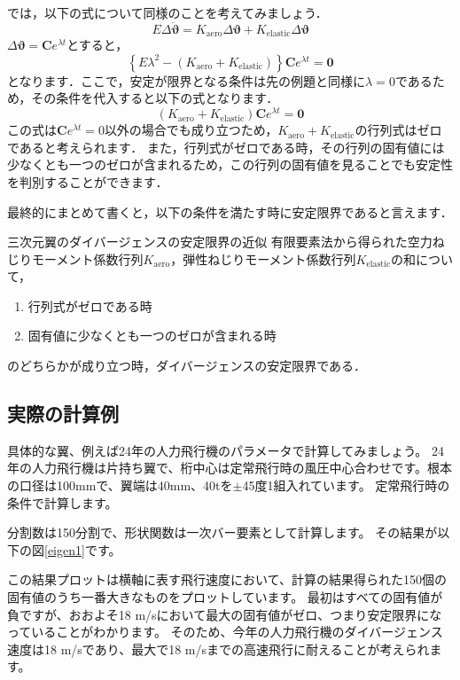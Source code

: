 \documentclass{jarticle}
\begin{document}
では，以下の式について同様のことを考えてみましょう．
\begin{equation}
    E\Delta\ddot{\bm{\vartheta}} = K_\mathrm{aero} \Delta\bm{\vartheta} + K_\mathrm{elastic} \Delta\bm{\vartheta}
\end{equation}
$\Delta\bm{\vartheta} = \bm{C}e^{\lambda t}$とすると，
\begin{equation}
    \left\{ E\lambda^2 - (K_\mathrm{aero} + K_\mathrm{elastic}) \right\}\bm{C}e^{\lambda t} = \bm{0}
\end{equation}
となります．ここで，安定が限界となる条件は先の例題と同様に$\lambda = 0$であるため，その条件を代入すると以下の式となります．
\begin{equation}
    (K_\mathrm{aero} + K_\mathrm{elastic})\bm{C}e^{\lambda t} = \bm{0}
\end{equation}
この式は$\bm{C}e^{\lambda t}=0$以外の場合でも成り立つため，$K_\mathrm{aero} + K_\mathrm{elastic}$の行列式はゼロであると考えられます．
また，行列式がゼロである時，その行列の固有値には少なくとも一つのゼロが含まれるため，この行列の固有値を見ることでも安定性を判別することができます．

最終的にまとめて書くと，以下の条件を満たす時に安定限界であると言えます．
\begin{itembox}[l]{三次元翼のダイバージェンスの安定限界の近似}
    有限要素法から得られた空力ねじりモーメント係数行列$K_\mathrm{aero}$，弾性ねじりモーメント係数行列$K_\mathrm{elastic}$の和について，
    \begin{enumerate}
        \item 行列式がゼロである時
        \item 固有値に少なくとも一つのゼロが含まれる時
    \end{enumerate}
    のどちらかが成り立つ時，ダイバージェンスの安定限界である．
\end{itembox}


\subsection{実際の計算例}

具体的な翼、例えば24年の人力飛行機のパラメータで計算してみましょう。
24年の人力飛行機は片持ち翼で、桁中心は定常飛行時の風圧中心合わせです。根本の口径は100mmで、翼端は40mm、40tを$\pm$45度1組入れています。
定常飛行時の条件で計算します。

分割数は150分割で、形状関数は一次バー要素として計算します。
その結果が以下の図\ref{eigen1}です。


この結果プロットは横軸に表す飛行速度において、計算の結果得られた150個の固有値のうち一番大きなものをプロットしています。
最初はすべての固有値が負ですが、おおよそ18 m/sにおいて最大の固有値がゼロ、つまり安定限界になっていることがわかります。
そのため、今年の人力飛行機のダイバージェンス速度は18 m/sであり、最大で18 m/sまでの高速飛行に耐えることが考えられます。
\end{document}
